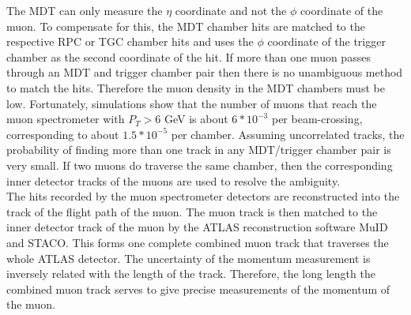 \indent The MDT can only measure the $\eta$ coordinate and not the $\phi$ coordinate of the muon. To compensate for this, the MDT chamber hits are matched to the respective RPC or TGC chamber hits and uses the $\phi$ coordinate of the trigger chamber as the second coordinate of the hit. If more than one muon passes through an MDT and trigger chamber pair then there is no unambiguous method to match the hits. Therefore the muon density in the MDT chambers must be low. Fortunately, simulations show that the number of muons that reach the muon spectrometer with $P_T > 6$ GeV is about $6*10^{-3}$ per beam-crossing, corresponding to about $1.5*10^{-5}$ per chamber.\cite{biblio:JINST} Assuming uncorrelated tracks, the probability of finding more than one track in any MDT/trigger chamber pair is very small. \cite{biblio:JINST} If two muons do traverse the same chamber, then the corresponding inner detector tracks of the muons are used to resolve the ambiguity. ~\\
\indent The hits recorded by the muon spectrometer detectors are reconstructed into the track of the flight path of the muon. The muon track is then matched to the inner detector track of the muon by the ATLAS reconstruction software MuID and STACO. This forms one complete combined muon track that traverses the whole ATLAS detector. The uncertainty of the momentum measurement is inversely related with the length of the track. Therefore, the long length the combined muon track serves to give precise measurements of the momentum of the muon. ~\\